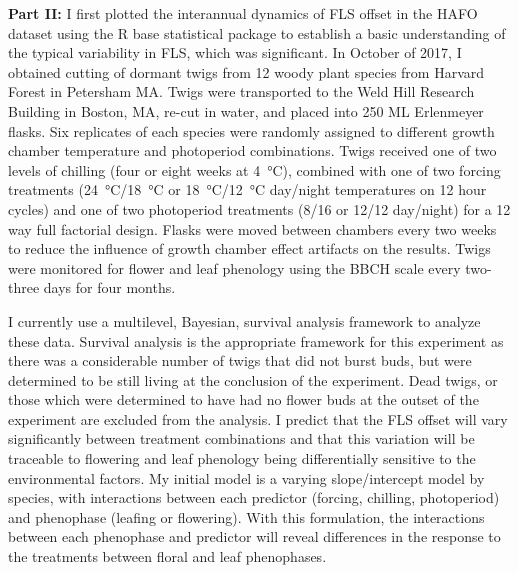 \documentclass[12pt]{article}\usepackage[]{graphicx}\usepackage[]{color}
\begin{document}
\indent\textbf{Part II:} I first plotted the interannual dynamics of FLS offset in the HAFO dataset using the R base statistical package to establish a basic understanding of the typical variability in FLS, which was significant. In October of 2017, I obtained cutting of dormant twigs from 12 woody plant species from Harvard Forest in Petersham MA. Twigs were transported to the Weld Hill Research Building in Boston, MA, re-cut in water, and placed into 250 ML Erlenmeyer flasks. Six replicates of each species were randomly assigned to different growth chamber temperature and photoperiod combinations. Twigs received one of two levels of chilling (four or eight weeks at \SI{4}{\degreeCelsius}), combined with one of two forcing treatments (\SI{24}{\degreeCelsius}/\SI{18}{\degreeCelsius} or \SI{18}{\degreeCelsius}/\SI{12}{\degreeCelsius} day/night temperatures on 12 hour cycles) and one of two photoperiod treatments (8/16 or 12/12 day/night) for a 12 way full factorial design. Flasks were moved between chambers every two weeks to reduce the influence of growth chamber effect artifacts on the results. Twigs were monitored for flower and leaf phenology using the BBCH scale \citep{Finn2007} every two-three days for four months.
\par I currently  use a multilevel, Bayesian, survival analysis framework to analyze these data. Survival analysis is the appropriate framework for this experiment as there was a considerable number of twigs that did not burst buds, but were determined to be still living at the conclusion of the experiment. Dead twigs, or those which were determined to have had no flower buds at the outset of the experiment are excluded from the analysis. I predict that the FLS offset will vary significantly between treatment combinations and that this variation will be traceable to flowering and leaf phenology being differentially sensitive to the environmental factors. My initial model is a varying slope/intercept model by species, with interactions between each predictor (forcing, chilling, photoperiod) and phenophase (leafing or flowering). With this formulation, the interactions between each phenophase and predictor will reveal differences in the response to the treatments between floral and leaf phenophases.
\end{document}
